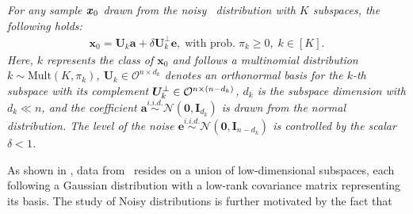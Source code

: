 \begin{assumption}\label{assum:subspace}
\emph{For any sample $\bm x_0$ drawn from the noisy \MoLRG~distribution with $K$ subspaces, the following holds: }
\begin{align}\label{eq:MoG noise}
    \bm x_0 = \bm U_k \bm a + \delta \bm U_k^{\perp} \bm e,\;\text{with prob.}\;\pi_k \geq 0,\; k \in [K].
\end{align}
\emph{Here, $k$ represents the class of $\bm x_0$ and follows a multinomial distribution $k \sim \text{Mult}(K,\pi_k)$, $\bm U_k \in \mathcal{O}^{n \times d_k}$ denotes an orthonormal basis for the $k$-th subspace with its complement $\bm U_k^\perp \in \mathcal{O}^{n \times (n-d_k)}$, $d_k$ is the subspace dimension with $d_k \ll n$, and the coefficient $\bm a \overset{i.i.d.}{\sim} \mathcal{N}(\bm 0, \bm I_{d_k})$ is drawn from the normal distribution. The level of the noise $\bm e \overset{i.i.d.}{\sim} \mathcal{N}(\bm 0, \bm I_{n-d_k})$ is controlled by the scalar $\delta < 1$. }
\end{assumption}
As shown in , data from \MoLRG~resides on a union of low-dimensional subspaces, each following a Gaussian distribution with a low-rank covariance matrix representing its basis. The study of Noisy \MoLRG\; distributions is further motivated by the fact that

